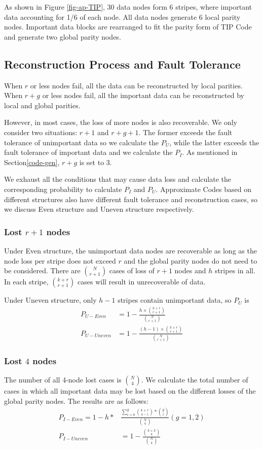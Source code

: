 \documentclass[sigconf]{acmart}
\begin{document}
As shown in Figure \ref{fig-ap-TIP}, 30 data nodes form 6 stripes, where important data accounting for 1/6 of each node.
All data nodes generate 6 local parity nodes.
Important data blocks are rearranged to fit the parity form of TIP Code and generate two global parity nodes.

\subsection{Reconstruction Process and Fault Tolerance}\label{ReconstructionFT}
When $r$ or less nodes fail, all the data can be reconstructed by local parities.
When $r+g$ or less nodes fail, all the important data can be reconstructed by local and global parities.

However, in most cases, the loss of more nodes is also recoverable. We only consider two situations: $r+1$ and $r+g+1$. 
The former exceeds the fault tolerance of unimportant data so we calculate the $P_{U}$, while the latter exceeds the fault tolerance of important data and we calculate the $P_{I}$.
As mentioned in Section\ref{code-gen}, $r+g$ is set to 3.

We exhaust all the conditions that may cause data loss and calculate the corresponding probability to calculate $P_{I}$ and $P_{U}$.
Approximate Codes based on different structures also have different fault tolerance and reconstruction cases, so we discuss Even structure and Uneven structure respectively. 

\subsubsection{Lost $r+1$ nodes}
Under Even structure, the unimportant data nodes are recoverable as long as the node loss per stripe does not exceed $r$ and the global parity nodes do not need to be considered.
There are $\binom{N}{r+1}$ cases of loss of $r+1$ nodes and $h$ stripes in all. In each stripe, $\binom{k+r}{r+1}$ cases will result in unrecoverable of data. 

Under Uneven structure, only $h-1$ stripes contain unimportant data, so $P_{U}$ is
\begin{align}
    P_{U-Even} &= 1 - \frac{h \times \binom{k+r}{r+1}}{\binom{N}{r+1}}\\
    P_{U-Uneven} &= 1 - \frac{(h-1) \times \binom{k+r}{r+1}}{\binom{N}{r+1}}
\end{align}

\subsubsection{Lost $4$ nodes}
The number of all 4-node lost cases is $\binom{N}{4}$.
We calculate the total number of cases in which all important data may be lost based on the different losses of the global parity nodes. The results are as follows:
\begin{align}
    P_{I-Even} = 1 - h*&\frac{\sum_{i=0}^{g} {\binom{k+r}{4-i}*\binom{g}{i}} }{\binom{N}{4}}  (g=1,2)\\
    P_{I-Uneven} &= 1 - \frac{\binom{k+3}{4}}{\binom{N}{4}}
\end{align}
\end{document}
